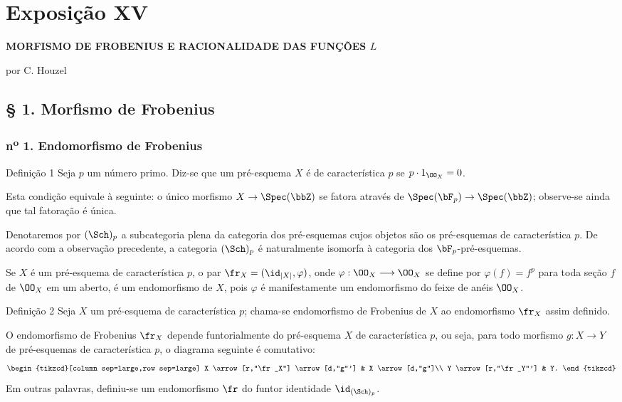 \clearpage
\section*{Exposição XV}
\begin{center}
\Large\bfseries MORFISMO DE FROBENIUS E RACIONALIDADE DAS FUNÇÕES $L$

\medskip
por C. Houzel
\end{center}

\subsection*{§ 1. Morfismo de Frobenius}

\subsubsection*{n\textsuperscript{o} 1. Endomorfismo de Frobenius}

\begin{statement}{Definição 1}
Seja $p$ um número primo. Diz-se que um pré-esquema $X$ é de característica $p$ se $p\cdot 1_{\OO_X}=0$.
\end{statement}

Esta condição equivale à seguinte: o único morfismo $X\to\Spec(\bbZ)$ se fatora através de $\Spec(\bF_p)\to\Spec(\bbZ)$; observe-se ainda que tal fatoração é única.

Denotaremos por $(\Sch)_p$ a subcategoria plena da categoria dos pré-esquemas cujos objetos são os pré-esquemas de característica $p$. De acordo com a observação precedente, a categoria $(\Sch)_p$ é naturalmente isomorfa à categoria dos $\bF_p$-pré-esquemas.

Se $X$ é um pré-esquema de característica $p$, o par $\fr_X=(\id_{|X|},\varphi)$, onde $\varphi:\OO_X\longrightarrow\OO_X$ se define por $\varphi(f)=f^p$ para toda seção $f$ de $\OO_X$ em um aberto, é um endomorfismo de $X$, pois $\varphi$ é manifestamente um endomorfismo do feixe de anéis $\OO_X$.

\begin{statement}{Definição 2}
Seja $X$ um pré-esquema de característica $p$; chama-se endomorfismo de Frobenius de $X$ ao endomorfismo $\fr_X$ assim definido.
\end{statement}

O endomorfismo de Frobenius $\fr_X$ depende funtorialmente do pré-esquema $X$ de característica $p$, ou seja, para todo morfismo $g:X\to Y$ de pré-esquemas de característica $p$, o diagrama seguinte é comutativo:
\[
\begin{tikzcd}[column sep=large,row sep=large]
X \arrow[r,"\fr_X"] \arrow[d,"g"'] & X \arrow[d,"g"]\\
Y \arrow[r,"\fr_Y"'] & Y.
\end{tikzcd}
\]
Em outras palavras, definiu-se um endomorfismo $\fr$ do funtor identidade $\id_{(\Sch)_p}$.
